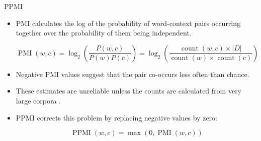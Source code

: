 \documentclass[handout]{beamer}
\begin{document}
\begin{frame}{PPMI}
\begin{scriptsize}
\begin{itemize}
\item  PMI calculates the log of the probability of word-context pairs occurring together over the probability of them being independent. 

\begin{equation}
 \operatorname{PMI}(w, c)= \log_2 \left( \frac{P(w,c)}{P(w)P(c)} \right) = \log_{2} \left ( \frac{\operatorname{count}(w,c)\times |D|}{\operatorname{count}(w)\times \operatorname{count}(c)} \right ) 
\end{equation}






\item Negative PMI values suggest that the pair co-occurs less often than chance. 
\item These estimates are unreliable unless the counts are calculated from very large corpora \cite{JurafskyBook}.
\item  PPMI corrects this problem by replacing negative values by zero:

\begin{equation}
 \operatorname{PPMI}(w, c)= \operatorname{max}(0,\operatorname{PMI}(w, c))
\end{equation}

\end{itemize}
\end{scriptsize}
\end{frame}
\end{document}
